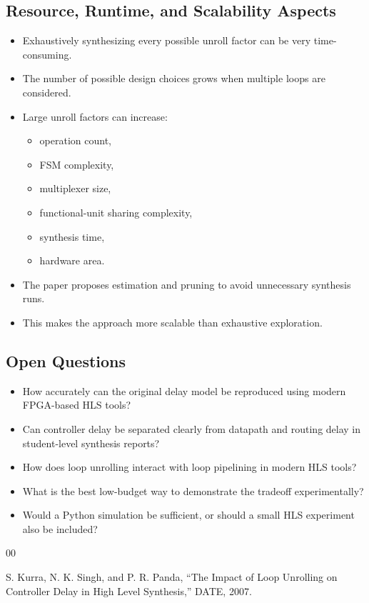 \documentclass[conference]{IEEEtran}
\begin{document}
\subsection{Resource, Runtime, and Scalability Aspects}

\begin{itemize}
    \item Exhaustively synthesizing every possible unroll factor can be very time-consuming.
    \item The number of possible design choices grows when multiple loops are considered.
    \item Large unroll factors can increase:
    \begin{itemize}
        \item operation count,
        \item FSM complexity,
        \item multiplexer size,
        \item functional-unit sharing complexity,
        \item synthesis time,
        \item hardware area.
    \end{itemize}
    \item The paper proposes estimation and pruning to avoid unnecessary synthesis runs.
    \item This makes the approach more scalable than exhaustive exploration.
\end{itemize}

\subsection{Open Questions}

\begin{itemize}
    \item How accurately can the original delay model be reproduced using modern FPGA-based HLS tools?
    \item Can controller delay be separated clearly from datapath and routing delay in student-level synthesis reports?
    \item How does loop unrolling interact with loop pipelining in modern HLS tools?
    \item What is the best low-budget way to demonstrate the tradeoff experimentally?
    \item Would a Python simulation be sufficient, or should a small HLS experiment also be included?
\end{itemize}

\begin{thebibliography}{00}

S. Kurra, N. K. Singh, and P. R. Panda, ``The Impact of Loop Unrolling on Controller Delay in High Level Synthesis,'' DATE, 2007.

\end{thebibliography}
\end{document}
